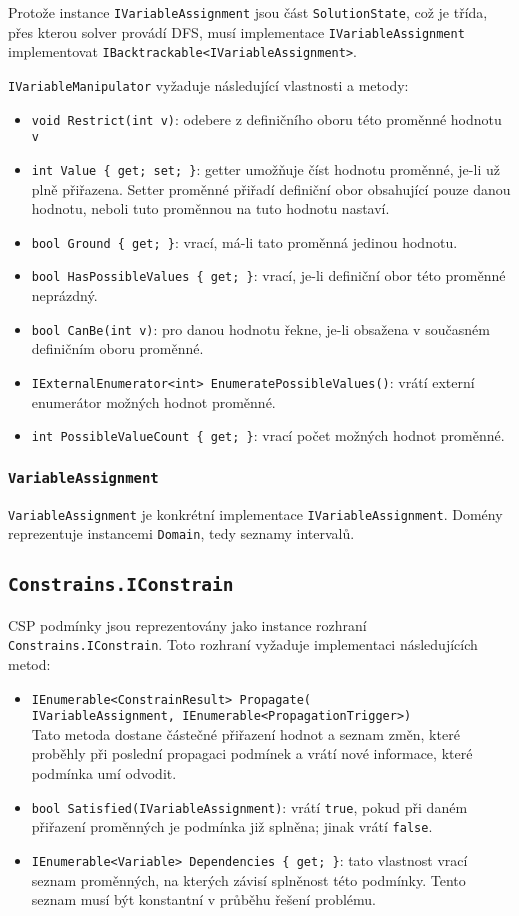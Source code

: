 \documentclass[a4paper]{article}
\begin{document}
Protože instance \texttt{IVariableAssignment} jsou část \texttt{SolutionState},
což je třída, přes kterou solver provádí DFS, musí implementace
\texttt{IVariableAssignment} implementovat
\texttt{IBacktrackable<IVariableAssignment>}.

\texttt{IVariableManipulator} vyžaduje následující vlastnosti a metody:
\begin{itemize}
\item
	\texttt{void Restrict(int v)}: odebere z definičního oboru této proměnné
	hodnotu \texttt{v}
\item
	\texttt{int Value \{ get; set; \}}: getter umožňuje číst hodnotu
	proměnné, je-li už plně přiřazena. Setter proměnné přiřadí definiční
	obor obsahující pouze danou hodnotu, neboli tuto proměnnou na tuto
	hodnotu nastaví.
\item
	\texttt{bool Ground \{ get; \}}: vrací, má-li tato proměnná jedinou
	hodnotu.
\item
	\texttt{bool HasPossibleValues \{ get; \}}: vrací, je-li definiční obor
	této proměnné neprázdný.
\item
	\texttt{bool CanBe(int v)}: pro danou hodnotu řekne, je-li obsažena v
	současném definičním oboru proměnné.
\item
	\texttt{IExternalEnumerator<int> EnumeratePossibleValues()}: vrátí
	externí enumerátor možných hodnot proměnné.
\item
	\texttt{int PossibleValueCount \{ get; \}}: vrací počet možných hodnot
	proměnné.
\end{itemize}

\subsubsection{\texttt{VariableAssignment}}
\texttt{VariableAssignment} je konkrétní implementace \texttt{IVariableAssignment}.
Domény reprezentuje instancemi \texttt{Domain}, tedy seznamy intervalů.

\subsection{\texttt{Constrains.IConstrain}}
CSP podmínky jsou reprezentovány jako instance rozhraní
\texttt{Constrains.IConstrain}. Toto rozhraní vyžaduje implementaci
následujících metod:
\begin{itemize}
\item
\texttt{IEnumerable<ConstrainResult> Propagate(\\
IVariableAssignment, IEnumerable<PropagationTrigger>)} \\
	Tato metoda dostane částečné přiřazení hodnot a seznam změn, které
	proběhly při poslední propagaci podmínek a vrátí nové informace, které
	podmínka umí odvodit.
\item
	\texttt{bool Satisfied(IVariableAssignment)}: vrátí \texttt{true}, pokud
	při daném přiřazení proměnných je podmínka již splněna; jinak vrátí
	\texttt{false}.
\item
	\texttt{IEnumerable<Variable> Dependencies \{ get; \}}: tato vlastnost
	vrací seznam proměnných, na kterých závisí splněnost této podmínky.
	Tento seznam musí být konstantní v průběhu řešení problému.
\end{itemize}
\end{document}
